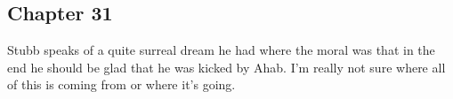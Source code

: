 \subsection{Chapter 31}

Stubb speaks of a quite surreal dream he had where the moral was that in the
end he should be glad that he was kicked by Ahab. I'm really not sure where all
of this is coming from or where it's going.

